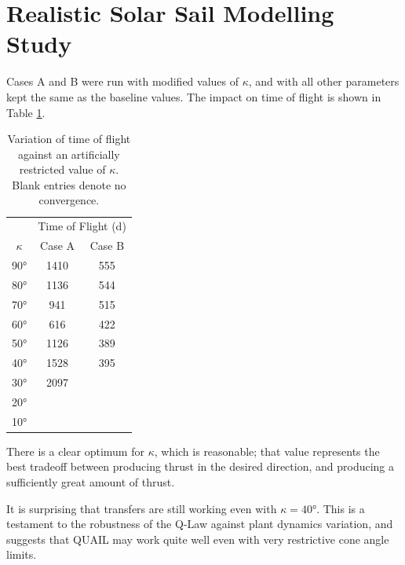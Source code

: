 \section{Realistic Solar Sail Modelling Study}

Cases A and B were run with modified values of \(\kappa\), and with all other parameters kept the same as the baseline values. The impact on time of flight is shown in Table \ref{tab:cone_angle_changing}.

\begin{table}[H]
    \centering
    \begin{tabular}{ccc}
        \toprule
                   & \multicolumn{2}{c}{Time of Flight (d)}          \\
        \(\kappa\) & Case A                                 & Case B \\
        \midrule
        \ang{90}   & 1410                                   & 555    \\
        \ang{80}   & 1136                                   & 544    \\
        \ang{70}   & 941                                    & 515    \\
        \ang{60}   & 616                                    & 422    \\
        \ang{50}   & 1126                                   & 389    \\
        \ang{40}   & 1528                                   & 395    \\
        \ang{30}   & 2097                                   &        \\
        \ang{20}   &                                        &        \\
        \ang{10}   &                                        &        \\
        \bottomrule
    \end{tabular}
    \caption{Variation of time of flight against an artificially restricted value of \(\kappa\). Blank entries denote no convergence.}
    \label{tab:cone_angle_changing}
\end{table}

There is a clear optimum for \(\kappa\), which is reasonable; that value represents the best tradeoff between producing thrust in the desired direction, and producing a sufficiently great amount of thrust.

It is surprising that transfers are still working even with \(\kappa = \ang{40}\). This is a testament to the robustness of the Q-Law against plant dynamics variation, and suggests that QUAIL may work quite well even with very restrictive cone angle limits.

